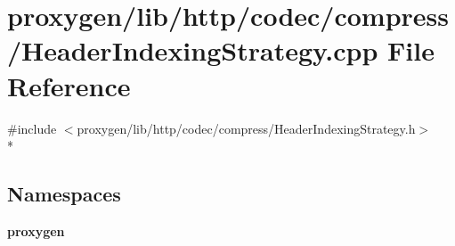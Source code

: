 \section{proxygen/lib/http/codec/compress/\+Header\+Indexing\+Strategy.cpp File Reference}
\label{HeaderIndexingStrategy_8cpp}
{\ttfamily \#include $<$proxygen/lib/http/codec/compress/\+Header\+Indexing\+Strategy.\+h$>$}\\*
\subsection*{Namespaces}
\begin{DoxyCompactItemize}
\item 
 {\bf proxygen}
\end{DoxyCompactItemize}

